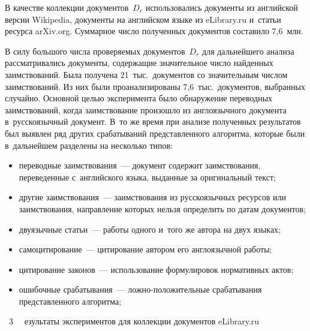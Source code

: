 \begin{multicols}{2}
В качестве коллекции документов~$D_e$ использовались документы из английской 
версии Wikipedia, документы на английском языке из {\sf eLibrary.ru} и~\mbox{статьи} ресурса 
arXiv.org. Суммарное число полученных документов составило 7,6~млн.

В силу большого числа проверяемых документов~$D_r$ для дальнейшего анализа 
рассматривались документы, содержащие значительное число найден\-ных 
заимствований.
Была получена 21~тыс.\ документов со значительным числом заимствований. Из них 
были проанализированы 7,6~тыс.\ документов, выбранных случайно. Основной \mbox{целью} 
эксперимента было обнаружение переводных заимствований, когда заимствование 
произошло из англоязычного документа в~русскоязычный документ. В~то же время при 
анализе полученных результатов был выявлен ряд других срабатываний 
представленного алгоритма, которые были в~дальнейшем разделены на несколько 
типов:
\begin{itemize}
\item переводные заимствования~--- документ содержит заимствования, 
переведенные с~английского языка, выданные за оригинальный текст;
\item другие заимствования~--- заимствования из русскоязычных ресурсов или 
заимствования, направление которых нельзя определить по датам документов;
\item двуязычные статьи~--- работы одного и~того же автора на двух языках;
\item самоцитирование~--- цитирование автором его англоязычной работы;
\item цитирование законов~--- использование формулировок нормативных актов;
\item ошибочные срабатывания~--- лож\-но-по\-ло\-жи\-тель\-ные срабатывания 
представленного алгоритма;
\end{itemize}

\begin{center}
\noindent
\parbox{202pt}{{{\tablename~3}\ \ \small{
езультаты экспериментов для коллекции документов {\sf eLibrary.ru}
}}
}


\vspace*{6pt}


\end{center}
\end{multicols}
